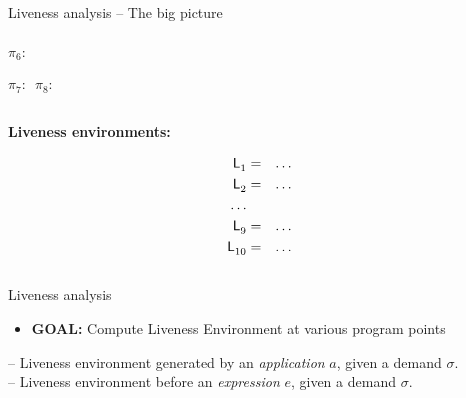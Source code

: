 \documentclass[xcolor=x11names,compress,mathserif]{beamer}
\renewcommand{\(}{\begin{columns}}
\renewcommand{\)}{\end{columns}}
\newcommand{\<}[1]{\begin{column}{#1}}
\renewcommand{\>}{\end{column}}
\begin{document}
\begin{frame}[t]{Liveness analysis -- The big picture}
\begin{columns}[c]
\begin{column}[T]{0.6\textwidth}
{\begin{uprogram}
          \hspace*{-2.4cm} \hspace*{.05cm}   $\pi_6\!\!:\, $


          \hspace*{-2.7cm}  \hspace*{.05cm}   $\pi_7\!\!:\,$
$\pi_8\!\!:\, $ 
\end{uprogram}}
 \end{column}
\end{columns}

\bigskip
\bigskip

\footnotesize

\begin{columns}[c]
  \begin{column}[T]{0.33\textwidth}
    \centerline{\bf Liveness environments:}
    \begin{eqnarray*}
      \mathsf{L}_{{1}}^{} &=& \ldots\\
      \mathsf{L}_{{2}}^{} &=& \ldots\\
      \ldots &&\\
      \mathsf{L}_{{9}}^{} &=& \ldots\\
      \mathsf{L}_{{10}}^{} &=& \ldots
    \end{eqnarray*}
  \end{column}
   
\end{columns}
\end{frame}
\begin{frame}{Liveness analysis}
  \begin{itemize}
  \item {\bf  GOAL:} Compute  Liveness Environment at  various program
    points
  \end{itemize}
  \bigskip\pause
    --  Liveness  environment  generated  by  an  {\em
    application} $a$, given a demand $\sigma$.\\
  \bigskip
   -- Liveness environment  before an {\em expression}
  $e$, given a demand $\sigma$.

\end{frame}
\end{document}

